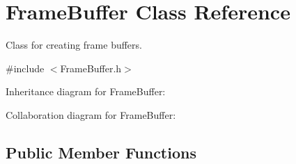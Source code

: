 \hypertarget{class_frame_buffer}{\section{Frame\-Buffer Class Reference}
\label{class_frame_buffer}
}


Class for creating frame buffers.  




{\ttfamily \#include $<$Frame\-Buffer.\-h$>$}



Inheritance diagram for Frame\-Buffer\-:


Collaboration diagram for Frame\-Buffer\-:
\subsection*{Public Member Functions}
